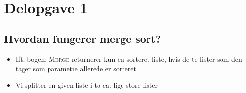 \section{Delopgave 1}\label{sec:delopgave-13}

\subsection{Hvordan fungerer merge sort?}\label{subsec:hvordan-fungerer-merge-sort?}

\begin{itemize}
    \item Ift. bogen: \textsc{Merge} returnerer kun en sorteret liste, hvis de to lister som den tager som parametre
          allerede er sorteret
    \item Vi splitter en given liste i to ca. lige store lister
\end{itemize}
